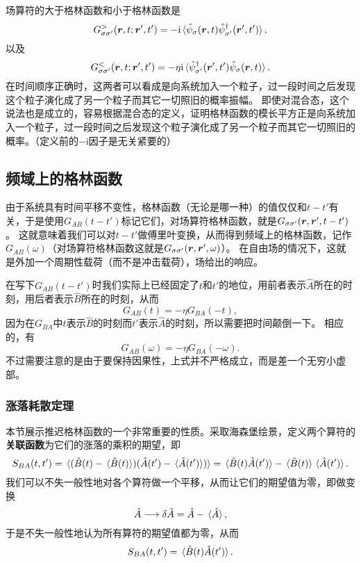 \documentclass[hyperref, UTF8, a4paper]{ctexart}
\newcommand*{\ii}{\mathrm{i}}
\begin{document}
场算符的大于格林函数和小于格林函数是
\begin{equation}
    G^>_{\sigma \sigma'} (\vb*{r}, t; \vb*{r}', t') = - \ii \expval*{\hat{\psi}_\sigma (\vb*{r}, t) \hat{\psi}_{\sigma'}^\dagger (\vb*{r}', t')},
\end{equation}
以及
\begin{equation}
    G^<_{\sigma \sigma'} (\vb*{r}, t; \vb*{r}', t') = - \eta \ii \expval*{\hat{\psi}_{\sigma'}^\dagger (\vb*{r}', t') \hat{\psi}_\sigma (\vb*{r}, t)}.
\end{equation}
在时间顺序正确时，这两者可以看成是向系统加入一个粒子，过一段时间之后发现这个粒子演化成了另一个粒子而其它一切照旧的概率振幅。
即使对混合态，这个说法也是成立的，容易根据混合态的定义，证明格林函数的模长平方正是向系统加入一个粒子，过一段时间之后发现这个粒子演化成了另一个粒子而其它一切照旧的概率。（定义前的$-\ii$因子是无关紧要的）

\subsection{频域上的格林函数}

由于系统具有时间平移不变性，格林函数（无论是哪一种）的值仅仅和$t-t'$有关，于是使用$G_{AB}(t-t')$标记它们，对场算符格林函数，就是$G_{\sigma \sigma'}(\vb*{r}, \vb*{r}', t-t')$。
这就意味着我们可以对$t-t'$做傅里叶变换，从而得到频域上的格林函数，记作$G_{AB}(\omega)$（对场算符格林函数这就是$G_{\sigma \sigma'}(\vb*{r}, \vb*{r}', \omega)$）。
在自由场的情况下，这就是外加一个周期性载荷（而不是冲击载荷），场给出的响应。

在写下$G_{AB}(t-t')$时我们实际上已经固定了$t$和$t'$的地位，用前者表示$\hat{A}$所在的时刻，用后者表示$\hat{B}$所在的时刻，从而
\[
    G_{AB}(t) = -\eta G_{BA}(-t),
\]
因为在$G_{BA}$中$t$表示$\hat{B}$的时刻而$t'$表示$\hat{A}$的时刻，所以需要把时间颠倒一下。
相应的，有
\[
    G_{AB}(\omega) = -\eta G_{BA}(-\omega).
\]
不过需要注意的是由于要保持因果性，上式并不严格成立，而是差一个无穷小虚部。%

\subsubsection{涨落耗散定理}

本节展示推迟格林函数的一个非常重要的性质。采取海森堡绘景，定义两个算符的\textbf{关联函数}为它们的涨落的乘积的期望，即
\begin{equation}
    S_{BA}(t,t') = \expval*{(\hat{B}(t) - \expval*{\hat{B}(t)}) (\hat{A}(t') - \expval*{\hat{A}(t')})} = \expval*{\hat{B}(t)\hat{A}(t')} - \expval*{\hat{B}(t)}\expval*{\hat{A}(t')}.
\end{equation}
我们可以不失一般性地对各个算符做一个平移，从而让它们的期望值为零，即做变换
\[
    \hat{A} \longrightarrow \var{\hat{A}} = \hat{A} - \expval*{\hat{A}},
\]
于是不失一般性地认为所有算符的期望值都为零，从而
\begin{equation}
    S_{BA}(t,t') = \expval*{\hat{B}(t)\hat{A}(t')}.
\end{equation}
\end{document}
